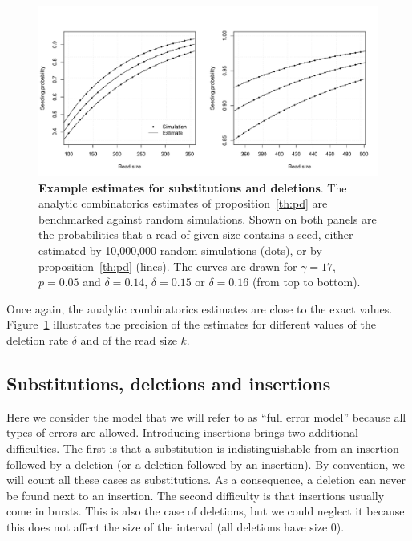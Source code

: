 \documentclass{article}
\begin{document}
\begin{figure}[h]
\centering
\includegraphics[scale=0.445]{simulpdel.pdf}
\caption{\textbf{Example estimates for substitutions and deletions}. The
analytic combinatorics estimates of proposition~\ref{th:pd} are
benchmarked against random simulations. Shown on both panels are the
probabilities that a read of given size contains a seed, either estimated
by 10,000,000 random simulations (dots), or by proposition~\ref{th:pd}
(lines). The curves are drawn for $\gamma=17$, $p=0.05$ and $\delta=0.14$,
$\delta=0.15$ or $\delta=0.16$ (from top to bottom).}
\label{fig:simulpdel}
\end{figure}

Once again, the analytic combinatorics estimates are close to the exact
values. Figure~\ref{fig:simulpdel} illustrates the precision of the
estimates for different values of the deletion rate $\delta$ and of the
read size $k$.






\subsection{Substitutions, deletions and insertions}
\label{sec:insertions}

Here we consider the model that we will refer to as ``full error model''
because all types of errors are allowed. Introducing insertions brings two
additional difficulties. The first is that a substitution is
indistinguishable from an insertion followed by a deletion (or a deletion
followed by an insertion). By convention, we will count all these cases as
substitutions. As a consequence, a deletion can never be found next to an
insertion. The second difficulty is that insertions usually come in
bursts. This is also the case of deletions, but we could neglect it
because this does not affect the size of the interval (all deletions have
size $0$). 
\end{document}
